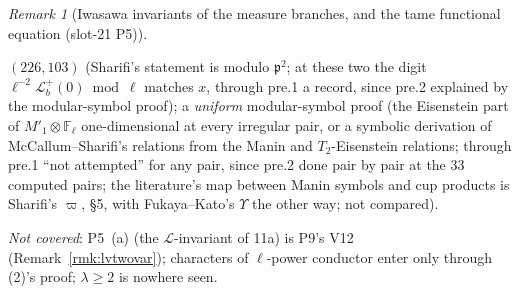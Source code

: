 \documentclass[11pt]{article}
\theoremstyle{remark}
\newtheorem{remark}[theorem]{Remark}
\newcommand{\F}{\mathbb{F}}
\begin{document}
\begin{remark}[Iwasawa invariants of the measure branches, and the tame functional equation (slot-21 P5)]
\begin{enumerate}
  $(226,103)$ (Sharifi's statement is modulo $\mathfrak p^{2}$; at these two the digit $\ell^{-2}\mathcal L^{+}_b(0)\bmod\ell$ matches $x$, through pre.1 a record, since pre.2 explained by the modular-symbol proof); a \emph{uniform}
  modular-symbol proof (the Eisenstein part of $M'_1\otimes\F_\ell$ one-dimensional at every irregular pair, or a symbolic derivation of McCallum--Sharifi's relations from the Manin and $T_2$-Eisenstein relations;
  through pre.1 ``not attempted'' for any pair, since pre.2 done pair by pair at the $33$ computed pairs; the literature's map between Manin symbols and cup products is
  Sharifi's $\varpi$, \cite{sharifi_reciprocity} \S5, with Fukaya--Kato's $\Upsilon$ the other way; not compared).
\end{enumerate}
\emph{Not covered}: P5~(a) (the $\mathcal L$-invariant of 11a) is P9's V12 (Remark~\ref{rmk:lvtwovar}); characters of $\ell$-power conductor enter only through (2)'s proof; $\lambda\ge2$ is nowhere seen.
\end{remark}
\end{document}
